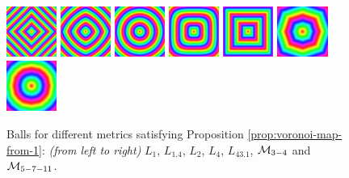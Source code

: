 \documentclass{llncs}
\begin{document}
\begin{figure}[htbp]
 {\includegraphics[width=1.65cm]{image-ball-1}}
 {\includegraphics[width=1.65cm]{image-ball-1-4}}
 {\includegraphics[width=1.65cm]{image-ball-2}}
 {\includegraphics[width=1.65cm]{image-ball-4}}
 {\includegraphics[width=1.65cm]{image-ball-43-1}}
 {\includegraphics[width=1.65cm]{image-ball-chamf34}}
 {\includegraphics[width=1.65cm]{image-ball-chamf5711}}
  \caption{Balls for different metrics satisfying Proposition \ref{prop:voronoi-map-from-1}: \emph{(from
      left to right)} $L_1$, $L_{1.4}$, $L_2$, $L_4$, $L_{43.1}$,
    $\mathcal{M}_{3-4}$ and $\mathcal{M}_{5-7-11}$.}
  \label{fig:metrics}
\end{figure}
%
\vspace{-1cm}
\end{document}
